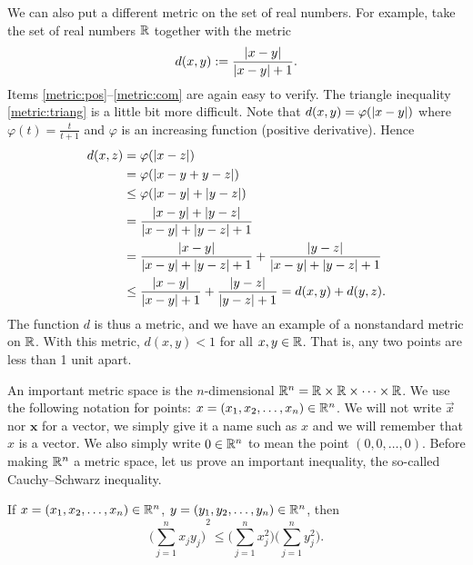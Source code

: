 \begin{example}
We can also put a different metric on the set of real numbers.
For example, take the set of real numbers ${\mathbb{R}}$ together with the metric
\begin{equation*}
d(x,y) :=
\frac{\left\lvert {x-y} \right\rvert}{\left\lvert {x-y} \right\rvert+1} .
\end{equation*}
Items \ref{metric:pos}--\ref{metric:com} are again easy to verify.  The
triangle inequality \ref{metric:triang} is a little bit more difficult.
Note that $d(x,y) = \varphi(\left\lvert {x-y} \right\rvert)$ where $\varphi(t) =
\frac{t}{t+1}$ and $\varphi$ is an increasing function
(positive derivative).  Hence
\begin{equation*}
\begin{split}
d(x,z) & = \varphi(\left\lvert {x-z} \right\rvert)\\
& = 
\varphi(\left\lvert {x-y+y-z} \right\rvert) \\
& \leq
\varphi(\left\lvert {x-y} \right\rvert+\left\lvert {y-z} \right\rvert)
\\
& =
\frac{\left\lvert {x-y} \right\rvert+\left\lvert {y-z} \right\rvert}{\left\lvert {x-y} \right\rvert+\left\lvert {y-z} \right\rvert+1} \\
& =
\frac{\left\lvert {x-y} \right\rvert}{\left\lvert {x-y} \right\rvert+\left\lvert {y-z} \right\rvert+1} +
\frac{\left\lvert {y-z} \right\rvert}{\left\lvert {x-y} \right\rvert+\left\lvert {y-z} \right\rvert+1}
\\
& \leq
\frac{\left\lvert {x-y} \right\rvert}{\left\lvert {x-y} \right\rvert+1} +
\frac{\left\lvert {y-z} \right\rvert}{\left\lvert {y-z} \right\rvert+1} =
d(x,y)+ d(y,z) .
\end{split}
\end{equation*}
The function $d$ is thus a metric, and we
have an example of a nonstandard metric on ${\mathbb{R}}$.  With this metric,
$d(x,y) < 1$ for all $x,y \in {\mathbb{R}}$.  That is,
any two points are less than 1 unit apart.
\end{example}

An important metric space is the
$n$-dimensional \emph{}
${\mathbb{R}}^n = {\mathbb{R}} \times {\mathbb{R}} \times \cdots \times {\mathbb{R}}$.   We use the following
notation for points: $x =(x_1,x_2,\ldots,x_n) \in {\mathbb{R}}^n$.  We will not write
$\vec{x}$ nor $\mathbf{x}$ for a vector, we simply give it a name such as
$x$ and we will remember that $x$ is a vector.
We also
simply write $0 \in {\mathbb{R}}^n$ to mean the point $(0,0,\ldots,0)$.  Before
making ${\mathbb{R}}^n$ a metric space, let us prove an important inequality, the
so-called Cauchy--Schwarz inequality.

\begin{lemma}
If $x =(x_1,x_2,\ldots,x_n) \in {\mathbb{R}}^n$, $y =(y_1,y_2,\ldots,y_n) \in
{\mathbb{R}}^n$, then
\begin{equation*}
{\biggl( \sum_{j=1}^n x_j y_j \biggr)}^2
\leq
\biggl(\sum_{j=1}^n x_j^2 \biggr)
\biggl(\sum_{j=1}^n y_j^2 \biggr) .
\end{equation*}
\end{lemma}

